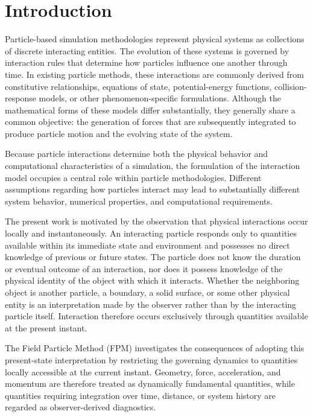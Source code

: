 \section{Introduction}

Particle-based simulation methodologies represent physical systems as collections of discrete interacting entities. 
The evolution of these systems is governed by interaction rules that determine how particles influence one another through
 time. In existing particle methods, these interactions are commonly derived from constitutive relationships, equations of 
state, potential-energy functions, collision-response models, or other phenomenon-specific formulations. Although the 
mathematical forms of these models differ substantially, they generally share a common objective: the generation of 
forces that are subsequently integrated to produce particle motion and the evolving state of the system.

Because particle interactions determine both the physical behavior and computational characteristics of a simulation, the formulation of the 
interaction model occupies a central role within particle methodologies. Different assumptions regarding how particles interact may 
lead to substantially different system behavior, numerical properties, and computational requirements.

The present work is motivated by the observation that physical interactions occur locally and instantaneously. 
An interacting particle responds only to quantities available within its immediate state and environment and possesses no direct 
knowledge of previous or future states. The particle does not know the duration or eventual outcome of an interaction, 
nor does it possess knowledge of the physical identity of the object with which it interacts. Whether the neighboring 
object is another particle, a boundary, a solid surface, or some other physical entity is an interpretation made by the 
observer rather than by the interacting particle itself. Interaction therefore occurs exclusively through quantities 
available at the present instant. 


The Field Particle Method (FPM) investigates the consequences of adopting this present-state interpretation by restricting 
the governing dynamics to quantities locally accessible at the current instant. Geometry, force, acceleration, 
and momentum are therefore treated as dynamically fundamental quantities, while quantities requiring integration over 
time, distance, or system history are regarded as observer-derived diagnostics.


